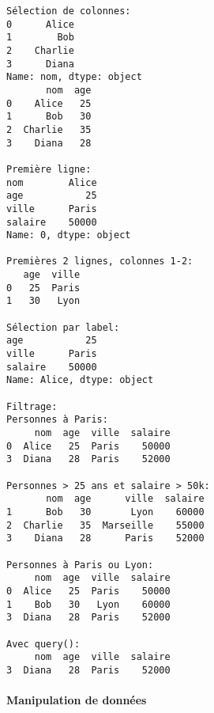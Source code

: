 \documentclass[11pt]{article}
\begin{document}
    \begin{Verbatim}[commandchars=\\\{\}]
Sélection de colonnes:
0      Alice
1        Bob
2    Charlie
3      Diana
Name: nom, dtype: object
       nom  age
0    Alice   25
1      Bob   30
2  Charlie   35
3    Diana   28

Première ligne:
nom        Alice
age           25
ville      Paris
salaire    50000
Name: 0, dtype: object

Premières 2 lignes, colonnes 1-2:
   age  ville
0   25  Paris
1   30   Lyon

Sélection par label:
age           25
ville      Paris
salaire    50000
Name: Alice, dtype: object

Filtrage:
Personnes à Paris:
     nom  age  ville  salaire
0  Alice   25  Paris    50000
3  Diana   28  Paris    52000

Personnes > 25 ans et salaire > 50k:
       nom  age      ville  salaire
1      Bob   30       Lyon    60000
2  Charlie   35  Marseille    55000
3    Diana   28      Paris    52000

Personnes à Paris ou Lyon:
     nom  age  ville  salaire
0  Alice   25  Paris    50000
1    Bob   30   Lyon    60000
3  Diana   28  Paris    52000

Avec query():
     nom  age  ville  salaire
3  Diana   28  Paris    52000
    \end{Verbatim}

    \paragraph{Manipulation de données}\label{manipulation-de-donnuxe9es}
\end{document}
